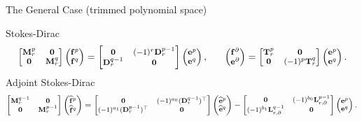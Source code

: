 \documentclass[aspectratio=169]{beamer}
\newcommand*{\dual}[1]{\ensuremath{\widehat{#1}}}
\begin{document}
\begin{frame}{The General Case (trimmed polynomial space) }

Stokes-Dirac
\begin{equation*}\footnotesize
	\begin{bmatrix}
		\mathbf{M}^p_r & \mathbf{0} \\
		\mathbf{0} & \mathbf{M}^q_r
	\end{bmatrix}
	\begin{pmatrix}
		\mathbf{f}^p \\
		\mathbf{f}^q
	\end{pmatrix} =
	\begin{bmatrix}
		\mathbf{0} & (-1)^r\mathbf{D}^{p-1}_r \\
		\mathbf{D}^{q-1}_r & \mathbf{0}
	\end{bmatrix}
	\begin{pmatrix}
		\mathbf{e}^p \\
		\mathbf{e}^q
	\end{pmatrix}, \qquad
	\begin{pmatrix}
		\mathbf{f}^\partial \\
		\mathbf{e}^\partial \\
	\end{pmatrix} = 
	\begin{bmatrix}
		\mathbf{T}^p_r & \mathbf{0} \\
		\mathbf{0} & (-1)^p\mathbf{T}^q_r \\
	\end{bmatrix}
	\begin{pmatrix}
		\mathbf{e}^p \\
		\mathbf{e}^q
	\end{pmatrix}.
\end{equation*}
Adjoint Stokes-Dirac
\begin{equation*}\footnotesize
	\begin{bmatrix}
		\mathbf{M}^{q-1}_r & \mathbf{0} \\
		\mathbf{0} & \mathbf{M}^{p-1}_r
	\end{bmatrix}
	\begin{pmatrix}
		\widehat{\mathbf{f}}^p \\
		\widehat{\mathbf{f}}^q
	\end{pmatrix} =
	\begin{bmatrix}
		\mathbf{0} & (-1)^{a_0}(\mathbf{D}_r^{q-1})^\top\\
		(-1)^{a_1}(\mathbf{D}_r^{p-1})^\top & \mathbf{0}
	\end{bmatrix}
	\begin{pmatrix}
		\dual{\mathbf{e}}^p \\
		\dual{\mathbf{e}}^q
	\end{pmatrix} -
	\begin{bmatrix}
		\mathbf{0} & (-1)^{b_0}\mathbf{L}_{r, \partial}^{p-1} \\
		(-1)^{b_1}\mathbf{L}^{q-1}_{r, \partial} & \mathbf{0}
	\end{bmatrix}
	\begin{pmatrix}
		{\mathbf{e}}^p \\
		{\mathbf{e}}^q
	\end{pmatrix}.
\end{equation*}


\end{frame}
\end{document}
